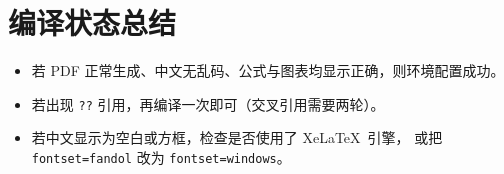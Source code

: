 \documentclass[UTF8, a4paper, 11pt, fontset=fandol]{ctexart}
\begin{document}
\section*{编译状态总结}

\begin{itemize}[noitemsep]
  \item 若 PDF 正常生成、中文无乱码、公式与图表均显示正确，则环境配置成功。
  \item 若出现 \texttt{??} 引用，再编译一次即可（交叉引用需要两轮）。
  \item 若中文显示为空白或方框，检查是否使用了 Xe\LaTeX\ 引擎，
        或把 \texttt{fontset=fandol} 改为 \texttt{fontset=windows}。
\end{itemize}
\end{document}
